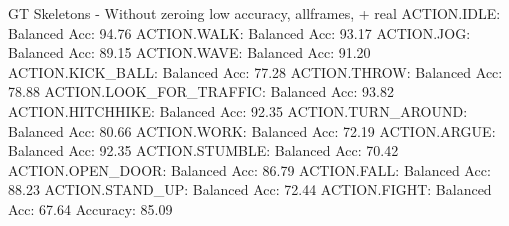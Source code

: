 GT Skeletons - Without zeroing low accuracy, allframes, + real
ACTION.IDLE: Balanced Acc: 94.76%
ACTION.WALK: Balanced Acc: 93.17%
ACTION.JOG: Balanced Acc: 89.15%
ACTION.WAVE: Balanced Acc: 91.20%
ACTION.KICK_BALL: Balanced Acc: 77.28%
ACTION.THROW: Balanced Acc: 78.88%
ACTION.LOOK_FOR_TRAFFIC: Balanced Acc: 93.82%
ACTION.HITCHHIKE: Balanced Acc: 92.35%
ACTION.TURN_AROUND: Balanced Acc: 80.66%
ACTION.WORK: Balanced Acc: 72.19%
ACTION.ARGUE: Balanced Acc: 92.35%
ACTION.STUMBLE: Balanced Acc: 70.42%
ACTION.OPEN_DOOR: Balanced Acc: 86.79%
ACTION.FALL: Balanced Acc: 88.23%
ACTION.STAND_UP: Balanced Acc: 72.44%
ACTION.FIGHT: Balanced Acc: 67.64%
Accuracy: 85.09%

